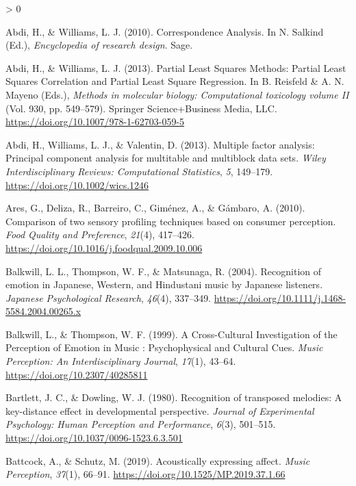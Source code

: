 \documentclass[
  english,
  man,floatsintext]{apa6}
\newlength{\cslhangindent}
\newenvironment{CSLReferences}[2] %
 {%
  \setlength{\parindent}{0pt}
  \ifodd #1 \everypar{\setlength{\hangindent}{\cslhangindent}}\ignorespaces\fi
  \ifnum #2 > 0
  \setlength{\parskip}{#2\baselineskip}
  \fi
 }%
 {}
\begin{document}
\hypertarget{refs}{}
\begin{CSLReferences}{1}{0}
\leavevmode\hypertarget{ref-Abdi2010d}{}%
Abdi, H., \& Williams, L. J. (2010). {Correspondence Analysis}. In N. Salkind (Ed.), \emph{Encyclopedia of research design}. Sage.

\leavevmode\hypertarget{ref-Abdi2013a}{}%
Abdi, H., \& Williams, L. J. (2013). {Partial Least Squares Methods: Partial Least Squares Correlation and Partial Least Square Regression}. In B. Reisfeld \& A. N. Mayeno (Eds.), \emph{Methods in molecular biology: Computational toxicology volume II} (Vol. 930, pp. 549--579). Springer Science+Business Media, LLC. \url{https://doi.org/10.1007/978-1-62703-059-5}

\leavevmode\hypertarget{ref-Abdi2013}{}%
Abdi, H., Williams, L. J., \& Valentin, D. (2013). {Multiple factor analysis: Principal component analysis for multitable and multiblock data sets}. \emph{Wiley Interdisciplinary Reviews: Computational Statistics}, \emph{5}, 149--179. \url{https://doi.org/10.1002/wics.1246}

\leavevmode\hypertarget{ref-Ares2010}{}%
Ares, G., Deliza, R., Barreiro, C., Giménez, A., \& Gámbaro, A. (2010). {Comparison of two sensory profiling techniques based on consumer perception}. \emph{Food Quality and Preference}, \emph{21}(4), 417--426. \url{https://doi.org/10.1016/j.foodqual.2009.10.006}

\leavevmode\hypertarget{ref-Balkwill2004}{}%
Balkwill, L. L., Thompson, W. F., \& Matsunaga, R. (2004). {Recognition of emotion in Japanese, Western, and Hindustani music by Japanese listeners}. \emph{Japanese Psychological Research}, \emph{46}(4), 337--349. \url{https://doi.org/10.1111/j.1468-5584.2004.00265.x}

\leavevmode\hypertarget{ref-Balkwill1999}{}%
Balkwill, L., \& Thompson, W. F. (1999). {A Cross-Cultural Investigation of the Perception of Emotion in Music : Psychophysical and Cultural Cues}. \emph{Music Perception: An Interdisciplinary Journal}, \emph{17}(1), 43--64. \url{https://doi.org/10.2307/40285811}

\leavevmode\hypertarget{ref-Bartlett1980}{}%
Bartlett, J. C., \& Dowling, W. J. (1980). {Recognition of transposed melodies: A key-distance effect in developmental perspective}. \emph{Journal of Experimental Psychology: Human Perception and Performance}, \emph{6}(3), 501--515. \url{https://doi.org/10.1037/0096-1523.6.3.501}

\leavevmode\hypertarget{ref-Battcock2019}{}%
Battcock, A., \& Schutz, M. (2019). {Acoustically expressing affect}. \emph{Music Perception}, \emph{37}(1), 66--91. \url{https://doi.org/10.1525/MP.2019.37.1.66}


\end{CSLReferences}
\end{document}

